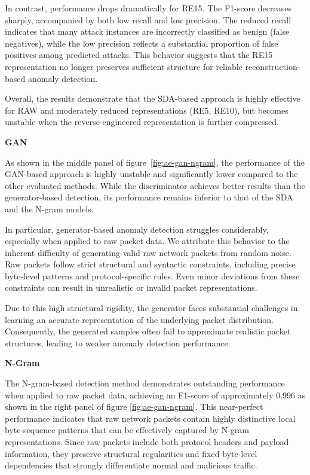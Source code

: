 In contrast, performance drops dramatically for RE15.
The F1-score decreases sharply, accompanied by both low recall
and low precision. The reduced recall indicates that many attack
instances are incorrectly classified as benign (false negatives),
while the low precision reflects a substantial proportion of
false positives among predicted attacks. This behavior suggests
that the RE15 representation no longer preserves sufficient
structure for reliable reconstruction-based anomaly detection.

Overall, the results demonstrate that the \ac{SDA}-based
approach is highly effective for RAW and moderately reduced
representations (RE5, RE10), but becomes unstable when the
reverse-engineered representation is further compressed.

\textbf{GAN}

As shown in the middle panel of figure~\ref{fig:ae-gan-ngram}, the performance of the GAN-based approach is highly unstable and significantly lower compared to the other evaluated methods. While the discriminator achieves better results than the generator-based detection, its performance remains inferior to that of the \ac{SDA} and the N-gram models.

In particular, generator-based anomaly detection struggles considerably, especially when applied to raw packet data. We attribute this behavior to the inherent difficulty of generating valid raw network packets from random noise. Raw packets follow strict structural and syntactic constraints, including precise byte-level patterns and protocol-specific rules. Even minor deviations from these constraints can result in unrealistic or invalid packet representations.

Due to this high structural rigidity, the generator faces substantial challenges in learning an accurate representation of the underlying packet distribution. Consequently, the generated samples often fail to approximate realistic packet structures, leading to weaker anomaly detection performance.


\textbf{N-Gram}


The N-gram-based detection method demonstrates outstanding performance when applied to raw packet data, achieving an F1-score of approximately 0.996 as shown in the right panel of figure \ref{fig:ae-gan-ngram}. This near-perfect performance indicates that raw network packets contain highly distinctive local byte-sequence patterns that can be effectively captured by N-gram representations. Since raw packets include both protocol headers and payload information, they preserve structural regularities and fixed byte-level dependencies that strongly differentiate normal and malicious traffic.

